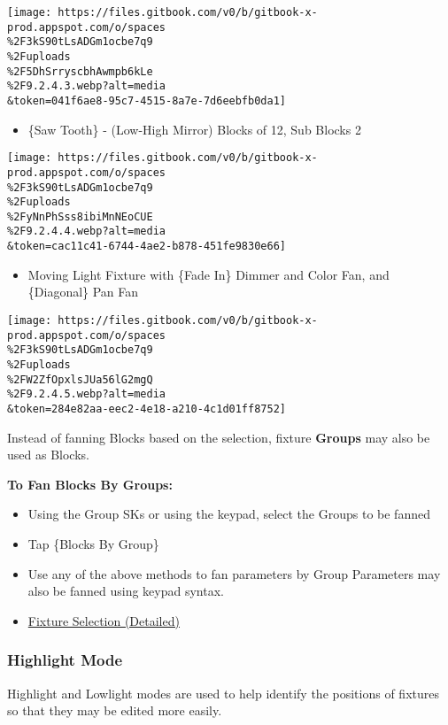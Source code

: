 \documentclass[
]{article}
\providecommand{\tightlist}{%
  \setlength{\itemsep}{0pt}\setlength{\parskip}{0pt}}
\begin{document}
\texttt{[image: https://files.gitbook.com/v0/b/gitbook-x-prod.appspot.com/o/spaces\\\%2F3kS90tLsADGm1ocbe7q9\\\%2Fuploads\\\%2F5DhSrryscbhAwmpb6kLe\\\%2F9.2.4.3.webp?alt=media\\\&token=041f6ae8-95c7-4515-8a7e-7d6eebfb0da1]}

\begin{itemize}
\tightlist
\item
  \{Saw Tooth\} - (Low-High Mirror) Blocks of 12, Sub Blocks 2
\end{itemize}

\texttt{[image: https://files.gitbook.com/v0/b/gitbook-x-prod.appspot.com/o/spaces\\\%2F3kS90tLsADGm1ocbe7q9\\\%2Fuploads\\\%2FyNnPhSss8ibiMnNEoCUE\\\%2F9.2.4.4.webp?alt=media\\\&token=cac11c41-6744-4ae2-b878-451fe9830e66]}

\begin{itemize}
\tightlist
\item
  Moving Light Fixture with \{Fade In\} Dimmer and Color Fan, and \{Diagonal\} Pan Fan
\end{itemize}

\texttt{[image: https://files.gitbook.com/v0/b/gitbook-x-prod.appspot.com/o/spaces\\\%2F3kS90tLsADGm1ocbe7q9\\\%2Fuploads\\\%2FW2ZfOpxlsJUa56lG2mgQ\\\%2F9.2.4.5.webp?alt=media\\\&token=284e82aa-eec2-4e18-a210-4c1d01ff8752]}

Instead of fanning Blocks based on the selection, fixture \textbf{Groups} may also be used as Blocks.

\textbf{To Fan Blocks By Groups:}

\begin{itemize}
\item
  Using the Group SKs or using the keypad, select the Groups to be fanned
\item
  Tap \{Blocks By Group\}
\item
  Use any of the above methods to fan parameters by Group Parameters may also be fanned using keypad syntax.
\item
  \href{https://vibemanual.compulite.com/programming-basics.html\#fixture-selection-detailed}{Fixture Selection (Detailed)}
\end{itemize}

\hypertarget{highlight-mode}{%
\subsubsection{Highlight Mode}\label{highlight-mode}}

Highlight and Lowlight modes are used to help identify the positions of fixtures so that they may be edited more easily.
\end{document}
